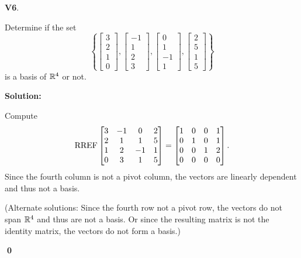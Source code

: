 \documentclass{article}
\newenvironment{problem}[1]
{
  \begin{flushleft}
  \textbf{#1}.
  \ignorespaces
}
{
  \end{flushleft}
}
\newenvironment{solution}
{
  \ignorespaces
  \textbf{Solution:}
}
{
  \ignorespacesafterend
  \begin{flushright}
  {\bfseries \qed}
  \end{flushright}
}
\begin{document}
\begin{problem}{V6}
Determine if the set \[ \left\{
 \begin{bmatrix} 3 \\ 2 \\ 1 \\ 0 \end{bmatrix} ,
 \begin{bmatrix} -1 \\ 1 \\ 2 \\ 3 \end{bmatrix} ,
 \begin{bmatrix} 0 \\ 1 \\ -1 \\ 1 \end{bmatrix} ,
 \begin{bmatrix} 2 \\ 5 \\ 1 \\ 5 \end{bmatrix} \right\} \]
is a basis of \(\mathbb{R}^4\) or not.
\end{problem}
\begin{solution}
Compute
\[\operatorname{RREF} \begin{bmatrix} 3 & -1 & 0 & 2 \\ 2 & 1 & 1 & 5 \\ 1 & 2 & -1 & 1 \\ 0 & 3 & 1 & 5 \end{bmatrix} =
\begin{bmatrix} 1 & 0 & 0 & 1 \\ 0 & 1 & 0 & 1 \\ 0 & 0 & 1 & 2 \\ 0 & 0 & 0 & 0 \end{bmatrix}.\]
Since the fourth column is not a pivot column, the vectors are linearly
dependent and thus not a basis.

(Alternate solutions:
Since the fourth row not a pivot row, the vectors do not span
\(\mathbb{R}^4\) and thus are not a basis. Or since the resulting matrix is not
the identity matrix, the vectors do not form a basis.)
\end{solution}
\end{document}
